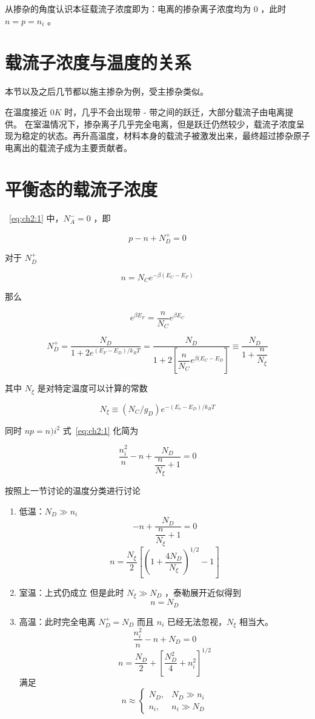 \documentclass[cn,11pt,chinese,black,simple]{../elegantbook}
\begin{document}
从掺杂的角度认识本征载流子浓度即为：电离的掺杂离子浓度均为 \(0\) ，此时 \(n = p = n_i\) 。



\section{载流子浓度与温度的关系}

本节以及之后几节都以施主掺杂为例，受主掺杂类似。

在温度接近 \(0 K\) 时，几乎不会出现带 - 带之间的跃迁，大部分载流子由电离提供。
在室温情况下，掺杂离子几乎完全电离，但是跃迁仍然较少，载流子浓度呈现为稳定的状态。再升高温度，材料本身的载流子被激发出来，最终超过掺杂原子电离出的载流子成为主要贡献者。



\section{平衡态的载流子浓度}

~\ref{eq:ch2:1} 中，\(N_A^- = 0\) ，即

\[p - n + N^+_D = 0\]

对于 \(N_D^+ \) 

\[n = N_C e^{-\beta (E_C - E_F)}\]

那么

\[e^{\beta E_F} = \dfrac{n}{N_C}e^{\beta E_C}\]

\[N_D^+ =\dfrac{N_D}{1 + 2 e^{(E_F - E_D)/k_B T}} = \dfrac{N_D}{1 + 2 \left[\dfrac{n}{N_C}e^{\beta (E_C - E_D} \right]} \equiv \dfrac{N_D}{1 + \dfrac{n}{N_{\xi}}}\] 

其中 \(N_\xi \) 是对特定温度可以计算的常数

\[N_\xi \equiv (N_C / g_D) e^{-(E_c - E_D)/k_B T}\]

同时 \(n p = n)i^2\) 式~\ref{eq:ch2:1} 化简为

\[\dfrac{n_i^2}{n} - n + \dfrac{N_D}{\dfrac{n}{N_\xi} + 1} = 0\]

按照上一节讨论的温度分类进行讨论

\begin{enumerate}
    \item 低温：\(N_D \gg n_i\) \[- n + \dfrac{N_D}{\dfrac{n}{N_\xi} + 1} = 0\]
    \[n = \dfrac{N_\xi}{2} \left[\left(1 + \dfrac{4N_D}{N_\xi}\right)^{1/2} -1\right]\]
    \item 室温：上式仍成立 但是此时 \(N_\xi \gg N_D\) ，泰勒展开近似得到
    \[n = N_D\]
    \item 高温：此时完全电离 \(N_D^+ = N_D\) 而且 \(n_i\) 已经无法忽视，\(N_\xi\) 相当大。
    \[\dfrac{n_i^2}{n} - n + N_D = 0\]
    \[n = \dfrac{N_D}{2} + \left[\dfrac{N_D^2}{4} + n_i^2\right]^{1/2}\]
    满足
    \begin{equation*}
        n \approx \left\{ 
        \begin{aligned}
            N_D, & N_D \gg n_i \\
            n_i, & n_i \gg N_D
        \end{aligned}\right.
    \end{equation*}
\end{enumerate}
\end{document}
